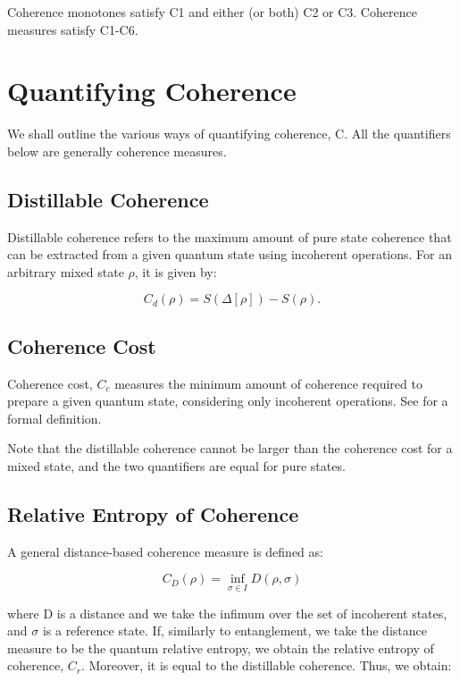 \documentclass[12pt]{article}
\begin{document}
Coherence monotones satisfy C1 and either (or both) C2 or C3. Coherence measures satisfy C1-C6.

\section{Quantifying Coherence}

We shall outline the various ways of quantifying coherence, C. All the quantifiers below are generally coherence measures.

\subsection{Distillable Coherence}

Distillable coherence refers to the maximum amount of pure state coherence that can be extracted from a given quantum state using incoherent operations. For an arbitrary mixed state $\rho$, it is given by:

\begin{equation}
    C_d(\rho) = S(\Delta[\rho]) - S(\rho).
\end{equation}

\subsection{Coherence Cost}

 Coherence cost, $C_c$ measures the minimum amount of coherence required to prepare a given quantum state, considering only incoherent operations. See \cite{...} for a formal definition.

 Note that the distillable coherence cannot be larger than the coherence cost for a mixed state, and the two quantifiers are equal for pure states. 

\subsection{Relative Entropy of Coherence}

A general distance-based coherence measure is defined as:

\begin{equation}
    C_D(\rho) = \inf_{\sigma \in I} D(\rho,\sigma)
\end{equation}

where D is a distance and we take the infimum over the set of incoherent states, and $\sigma$ is a reference state. If, similarly to entanglement, we take the distance measure to be the quantum relative entropy, we obtain the relative entropy of coherence, $C_r$. Moreover, it is equal to the distillable coherence. Thus, we obtain:
\end{document}

